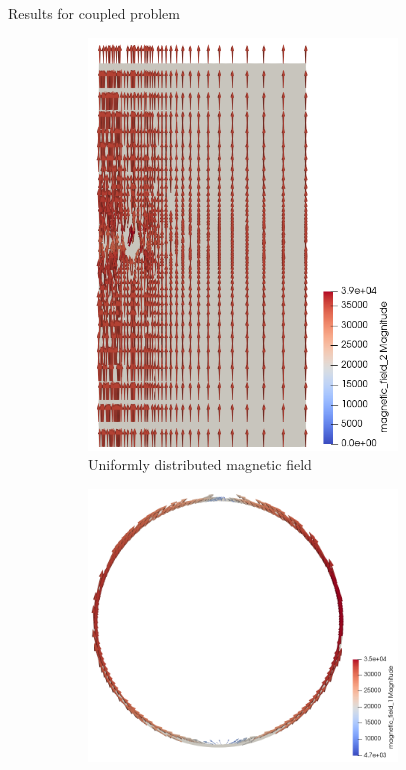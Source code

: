 \documentclass{beamer}
\begin{document}
\begin{frame}{Results for coupled problem}
{\begin{figure}[h]
\begin{subfigure}{0.32\textwidth}
\includegraphics[width=0.9\textwidth]{magnetic_field_50.png}
\caption{Uniformly distributed magnetic field}
\end{subfigure}
\begin{subfigure}{0.32\textwidth}
\centering
\includegraphics[width=0.9\textwidth]{magnetic_field_toroid_coupled.png}

\end{subfigure}
\end{figure}}
\end{frame}
\end{document}
